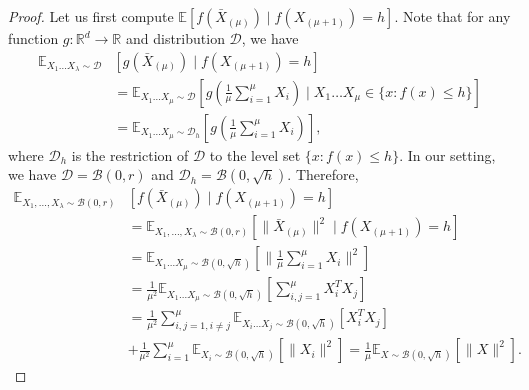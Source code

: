 \begin{proof}
Let us first compute $\mathbb{E}\left[f\left(\bar{X}_{(\mu)}\right)\mid f(X_{(\mu+1)})=h\right]$.
Note that for any function $g:\mathbb{R}^d\rightarrow\mathbb{R}$ and distribution $\mathcal{D}$, we
have 
\begin{align*}
\mathbb{E}_{X_{1}\ldots X_{\lambda}\sim\mathcal{D}}&\left[g(\bar{X}_{(\mu)})\mid f(X_{(\mu+1)})=h\right]\\ &=\mathbb{E}_{X_{1}\ldots X_{\mu}\sim\mathcal{D}}\left[g\left(\frac{1}{\mu}\sum_{i=1}^{\mu}X_{i}\right)\mid X_{1}\ldots X_{\mu}\in\{x:f(x)\leq h\}\right]\\
 & =\mathbb{E}_{X_{1}\ldots X_{\mu}\sim\mathcal{D}_{h}}\left[g\left(\frac{1}{\mu}\sum_{i=1}^{\mu}X_{i}\right)\right],
\end{align*}
where $\mathcal{D}_h$ is the restriction of $\mathcal{D}$ to the level set $\{x:f(x) \le h\}$. In our setting, we have $\mathcal{D}=\mathcal{B}(0,r)$ and $\mathcal{D}_h = \mathcal{B}(0,\sqrt{h})$. Therefore,
\begin{align*}
 \mathbb{E}_{X_1,...,X_\lambda\sim\mathcal{B}(0,r)}&\left[f\left(\bar{X}_{(\mu)}\right)\mid f(X_{(\mu+1)})=h\right]\\
 &=\mathbb{E}_{X_1,...,X_\lambda\sim\mathcal{B}(0,r)}\left[\lVert \bar{X}_{(\mu)}\rVert ^2\mid f(X_{(\mu+1)})=h\right]  \\
 & =\mathbb{E}_{X_{1}\ldots X_{\mu}\sim\mathcal{B}(0,\sqrt{h})}\left[\lVert \frac1\mu\sum_{i=1}^\mu X_i\rVert ^2\right]\\
 & =\frac{1}{\mu^2}\mathbb{E}_{X_{1}\ldots X_{\mu}\sim\mathcal{B}(0,\sqrt{h})}\left[\sum_{i,j=1}^\mu X_i^TX_j\right]\\
 & = \frac{1}{\mu^2}\sum_{i,j=1,i\neq j}^\mu \mathbb{E}_{X_{i}\ldots X_{j}\sim\mathcal{B}(0,\sqrt{h})}\left[X_i^TX_j\right]\\
 &+\frac{1}{\mu^2}\sum_{i=1}^\mu\mathbb{E}_{X_{i}\sim\mathcal{B}(0,\sqrt{h})}\left[\lVert X_i\rVert ^2\right]
 = \frac1\mu \mathbb{E}_{X\sim\mathcal{B}(0,\sqrt{h})}\left[\lVert X\rVert ^2\right].

\end{align*}
\end{proof}
